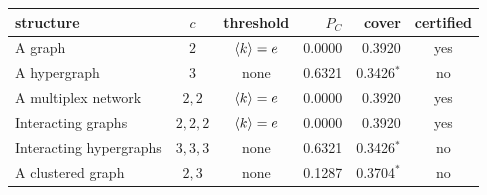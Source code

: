 \begin{tabular}{lccrrc}
\hline\hline
structure & $c$ & threshold & $P_{C}$ & cover & certified\\
\hline
A graph & $2$ & $\langle k \rangle=e$ & 0.0000 & 0.3920 & yes\\
A hypergraph & $3$ & none & 0.6321 & 0.3426$^{*}$ & no\\
A multiplex network & $2,2$ & $\langle k \rangle=e$ & 0.0000 & 0.3920 & yes\\
Interacting graphs & $2,2,2$ & $\langle k \rangle=e$ & 0.0000 & 0.3920 & yes\\
Interacting hypergraphs & $3,3,3$ & none & 0.6321 & 0.3426$^{*}$ & no\\
A clustered graph & $2,3$ & none & 0.1287 & 0.3704$^{*}$ & no\\
\hline\hline
\end{tabular}
